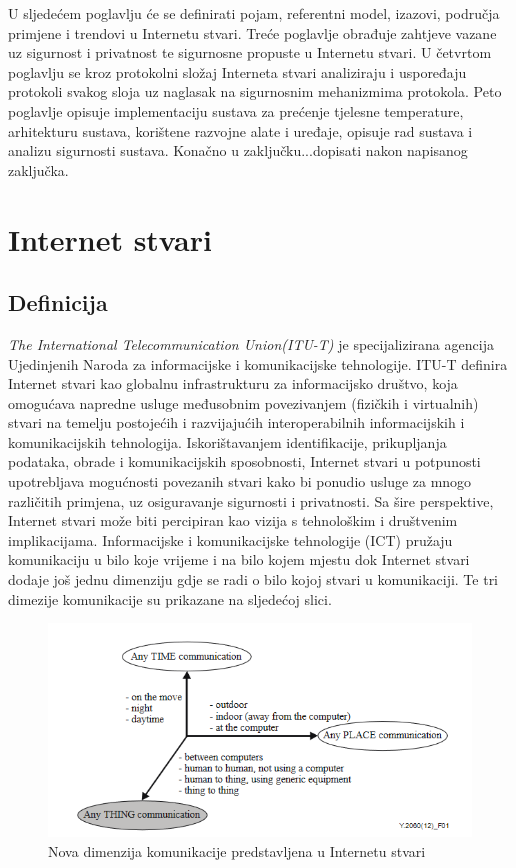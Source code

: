 \documentclass[times, utf8, diplomski]{fer}
\begin{document}
U sljedećem poglavlju će se definirati pojam, referentni model, izazovi, područja primjene i trendovi u Internetu stvari. Treće poglavlje obrađuje zahtjeve vazane uz sigurnost i privatnost te sigurnosne propuste u Internetu stvari. U četvrtom poglavlju se kroz protokolni složaj Interneta stvari analiziraju i uspoređaju protokoli svakog sloja uz naglasak na sigurnosnim mehanizmima protokola. Peto poglavlje opisuje implementaciju sustava za prećenje tjelesne temperature, arhitekturu sustava, korištene razvojne alate i uređaje, opisuje rad sustava i analizu sigurnosti sustava. Konačno u zaključku...dopisati nakon napisanog zaključka.

\chapter{Internet stvari}

\section{Definicija}
\emph{The International Telecommunication Union(ITU-T)} je specijalizirana agencija Ujedinjenih Naroda za informacijske i komunikacijske tehnologije. ITU-T definira Internet stvari kao globalnu infrastrukturu za informacijsko društvo, koja omogućava napredne usluge međusobnim povezivanjem (fizičkih i virtualnih) stvari na temelju postojećih i razvijajućih interoperabilnih informacijskih i komunikacijskih tehnologija. Iskorištavanjem identifikacije, prikupljanja podataka, obrade i komunikacijskih sposobnosti, Internet stvari u potpunosti upotrebljava mogućnosti povezanih stvari kako bi ponudio usluge za mnogo različitih primjena, uz osiguravanje sigurnosti i privatnosti. Sa šire perspektive, Internet stvari može biti percipiran kao vizija s tehnološkim i društvenim implikacijama\citep{ITU-T/IoT}. Informacijske i komunikacijske tehnologije (ICT) pružaju komunikaciju u bilo koje vrijeme i na bilo kojem mjestu dok Internet stvari dodaje još jednu dimenziju gdje se radi o bilo kojoj stvari u komunikaciji. Te tri dimezije komunikacije su prikazane na sljedećoj slici.
\begin{figure}[htb]
    \centering
    \includegraphics[width=14cm]{images/3dimenzije.png}
    \caption{Nova dimenzija komunikacije predstavljena u Internetu stvari\citep{ITU-T/IoT}}
    \label{fig:3-dim}
\end{figure}
\end{document}
